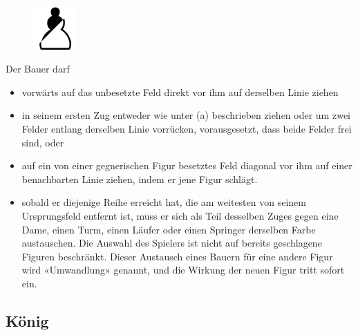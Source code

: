 \documentclass[a4paper, 10pt]{scrartcl}
\begin{document}
\begin{figure}
        \includegraphics[width=0.15\textwidth, right]{assets/pawn_split.png}
\end{figure}
Der Bauer darf
\begin{itemize}
        \item vorwärts auf das unbesetzte Feld direkt vor ihm auf derselben Linie ziehen
        \item in seinem ersten Zug entweder wie unter (a) beschrieben ziehen oder um zwei Felder entlang derselben Linie vorrücken, vorausgesetzt, dass beide Felder frei sind, oder
        \item auf ein von einer gegnerischen Figur besetztes Feld diagonal vor ihm auf einer benachbarten Linie ziehen, indem er jene Figur schlägt.
        \item sobald er diejenige Reihe erreicht hat, die am weitesten von seinem Ursprungsfeld entfernt ist, muss er sich als Teil desselben Zuges gegen eine Dame, einen Turm, einen Läufer oder einen Springer derselben Farbe austauschen. Die Auswahl des Spielers ist nicht auf bereits geschlagene Figuren beschränkt. Dieser Austausch eines Bauern für eine andere Figur wird «Umwandlung» genannt, und die Wirkung der neuen Figur tritt sofort ein.
\end{itemize}


\subsection*{König}
\end{document}
